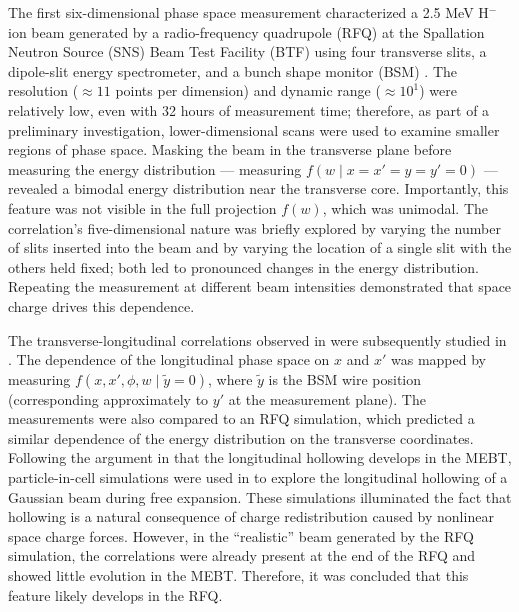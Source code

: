 \documentclass[%
 reprint,
nofootinbib,
 amsmath,amssymb,
 aps,
prstab,
]{revtex4-2}
\begin{document}
The first six-dimensional phase space measurement characterized a 2.5 MeV H$^-$ ion beam generated by a radio-frequency quadrupole (RFQ) at the Spallation Neutron Source (SNS) Beam Test Facility (BTF) using four transverse slits, a dipole-slit energy spectrometer, and a bunch shape monitor (BSM) \cite{Cathey2018}. The resolution ($\approx 11$ points per dimension) and dynamic range ($\approx 10^1$) were relatively low, even with 32 hours of measurement time; therefore, as part of a preliminary investigation, lower-dimensional scans were used to examine smaller regions of phase space. Masking the beam in the transverse plane before measuring the energy distribution --- measuring $f(w \mid x{=}x'{=}y{=}y'{=}0)$ --- revealed a bimodal energy distribution near the transverse core. Importantly, this feature was not visible in the full projection $f(w)$, which was unimodal. The correlation's five-dimensional nature was briefly explored by varying the number of slits inserted into the beam and by varying the location of a single slit with the others held fixed; both led to pronounced changes in the energy distribution. Repeating the measurement at different beam intensities demonstrated that space charge drives this dependence.

The transverse-longitudinal correlations observed in \cite{Cathey2018} were subsequently studied in \cite{Ruisard2020}. The dependence of the longitudinal phase space on $x$ and $x'$ was mapped by measuring $f(x, x', \phi, w \mid \tilde{y}{=}0)$, where $\tilde{y}$ is the BSM wire position (corresponding approximately to $y'$ at the measurement plane). The measurements were also compared to an RFQ simulation, which predicted a similar dependence of the energy distribution on the transverse coordinates. Following the argument in \cite{Cathey2018} that the longitudinal hollowing develops in the MEBT, particle-in-cell simulations were used in \cite{Ruisard2021} to explore the longitudinal hollowing of a Gaussian beam during free expansion. These simulations illuminated the fact that hollowing is a natural consequence of charge redistribution caused by nonlinear space charge forces. However, in the ``realistic'' beam generated by the RFQ simulation, the correlations were already present at the end of the RFQ and showed little evolution in the MEBT. Therefore, it was concluded that this feature likely develops in the RFQ.
\end{document}
